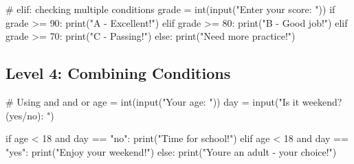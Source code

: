 \documentclass[
  letterpaper,
  DIV=11,
  numbers=noendperiod,
  oneside]{scrreprt}
\newenvironment{Shaded}{}{}
\newcommand{\BuiltInTok}[1]{\textcolor[rgb]{0.84,0.23,0.29}{#1}}
\newcommand{\CommentTok}[1]{\textcolor[rgb]{0.42,0.45,0.49}{#1}}
\newcommand{\ControlFlowTok}[1]{\textcolor[rgb]{0.84,0.23,0.29}{#1}}
\newcommand{\DecValTok}[1]{\textcolor[rgb]{0.00,0.36,0.77}{#1}}
\newcommand{\KeywordTok}[1]{\textcolor[rgb]{0.84,0.23,0.29}{#1}}
\newcommand{\NormalTok}[1]{\textcolor[rgb]{0.14,0.16,0.18}{#1}}
\newcommand{\OperatorTok}[1]{\textcolor[rgb]{0.14,0.16,0.18}{#1}}
\newcommand{\StringTok}[1]{\textcolor[rgb]{0.01,0.18,0.38}{#1}}
\begin{document}
\begin{Shaded}
\begin{Highlighting}[]
\CommentTok{\# elif: checking multiple conditions}
\NormalTok{grade }\OperatorTok{=} \BuiltInTok{int}\NormalTok{(}\BuiltInTok{input}\NormalTok{(}\StringTok{"Enter your score: "}\NormalTok{))}
\ControlFlowTok{if}\NormalTok{ grade }\OperatorTok{\textgreater{}=} \DecValTok{90}\NormalTok{:}
    \BuiltInTok{print}\NormalTok{(}\StringTok{"A {-} Excellent!"}\NormalTok{)}
\ControlFlowTok{elif}\NormalTok{ grade }\OperatorTok{\textgreater{}=} \DecValTok{80}\NormalTok{:}
    \BuiltInTok{print}\NormalTok{(}\StringTok{"B {-} Good job!"}\NormalTok{)}
\ControlFlowTok{elif}\NormalTok{ grade }\OperatorTok{\textgreater{}=} \DecValTok{70}\NormalTok{:}
    \BuiltInTok{print}\NormalTok{(}\StringTok{"C {-} Passing!"}\NormalTok{)}
\ControlFlowTok{else}\NormalTok{:}
    \BuiltInTok{print}\NormalTok{(}\StringTok{"Need more practice!"}\NormalTok{)}
\end{Highlighting}
\end{Shaded}

\subsection{Level 4: Combining
Conditions}\label{level-4-combining-conditions}

\begin{Shaded}
\begin{Highlighting}[]
\CommentTok{\# Using \textquotesingle{}and\textquotesingle{} and \textquotesingle{}or\textquotesingle{}}
\NormalTok{age }\OperatorTok{=} \BuiltInTok{int}\NormalTok{(}\BuiltInTok{input}\NormalTok{(}\StringTok{"Your age: "}\NormalTok{))}
\NormalTok{day }\OperatorTok{=} \BuiltInTok{input}\NormalTok{(}\StringTok{"Is it weekend? (yes/no): "}\NormalTok{)}

\ControlFlowTok{if}\NormalTok{ age }\OperatorTok{\textless{}} \DecValTok{18} \KeywordTok{and}\NormalTok{ day }\OperatorTok{==} \StringTok{"no"}\NormalTok{:}
    \BuiltInTok{print}\NormalTok{(}\StringTok{"Time for school!"}\NormalTok{)}
\ControlFlowTok{elif}\NormalTok{ age }\OperatorTok{\textless{}} \DecValTok{18} \KeywordTok{and}\NormalTok{ day }\OperatorTok{==} \StringTok{"yes"}\NormalTok{:}
    \BuiltInTok{print}\NormalTok{(}\StringTok{"Enjoy your weekend!"}\NormalTok{)}
\ControlFlowTok{else}\NormalTok{:}
    \BuiltInTok{print}\NormalTok{(}\StringTok{"You\textquotesingle{}re an adult {-} your choice!"}\NormalTok{)}
\end{Highlighting}
\end{Shaded}
\end{document}
